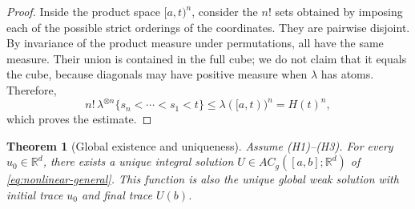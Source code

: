 \documentclass[preprint,12pt]{elsarticle}
\newtheorem{theorem}{Theorem}[section]
\theoremstyle{definition}
\theoremstyle{remark}
\newcommand{\R}{\mathbb R}
\begin{document}
\begin{proof}
Inside the product space $[a,t)^n$, consider the $n!$ sets obtained by imposing each of the possible strict orderings of the coordinates. They are pairwise disjoint. By invariance of the product measure under permutations, all have the same measure. Their union is contained in the full cube; we do not claim that it equals the cube, because diagonals may have positive measure when $\lambda$ has atoms. Therefore,
\[
 n!\,\lambda^{\otimes n}\{s_n<\cdots<s_1<t\}
 \le \lambda([a,t))^n=H(t)^n,
\]
which proves the estimate.
\end{proof}

\begin{theorem}[Global existence and uniqueness]\label{thm:existence-general}
Assume \textup{(H1)--(H3)}. For every $u_0\in\R^d$, there exists a unique integral solution $U\in AC_g([a,b];\R^d)$ of \eqref{eq:nonlinear-general}. This function is also the unique global weak solution with initial trace $u_0$ and final trace $U(b)$.
\end{theorem}
\end{document}
